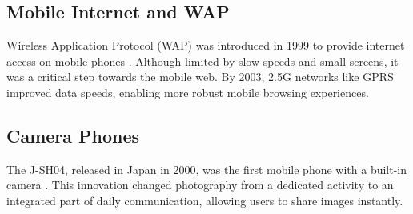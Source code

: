 \documentclass[12pt, a4paper]{article}
\begin{document}
\subsection{Mobile Internet and WAP}
Wireless Application Protocol (WAP) was introduced in 1999 to provide internet access on mobile phones \cite{wap_internet}. Although limited by slow speeds and small screens, it was a critical step towards the mobile web. By 2003, 2.5G networks like GPRS improved data speeds, enabling more robust mobile browsing experiences.

\subsection{Camera Phones}
The J-SH04, released in Japan in 2000, was the first mobile phone with a built-in camera \cite{camera_phones}. This innovation changed photography from a dedicated activity to an integrated part of daily communication, allowing users to share images instantly.
\end{document}
